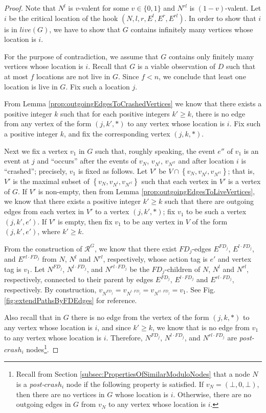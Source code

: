 \documentclass[11pt]{article}
\numberwithin{theorem}{section}
\newcommand{\set}[1]{\left\{#1\right\}}
\begin{document}
\begin{proof}
Note that $N^l$ is $v$-valent for some $v\in\{0,1\}$ and $N^{rl}$ is $(1-v)$-valent. 
Let $i$ be the critical location of the hook $(N,l,r,E^l,E^r,E^{rl})$. 
In order to show that $i$ is in $live(G)$, we have to show that $G$ contains infinitely many vertices whose location is $i$.

For the purpose of contradiction, we assume that $G$ contains only finitely many vertices whose location is $i$. Recall that $G$ is a viable observation of $D$ such that at most $f$ locations are not live in $G$. Since $f<n$, we conclude that least one location is live in $G$. Fix such a location $j$.



From Lemma \ref{prop:outgoingEdgesToCrashedVertices} we know that there exists a positive integer $k$ such that for each positive integers $k' \geq k$, there is no edge from any vertex of the form $(j,k',*)$ to any vertex whose location is $i$. Fix such a positive integer $k$, and fix the corresponding vertex $(j,k,*)$.

Next we fix a vertex $v_1$ in $G$ such that, roughly speaking, the event $e''$ of $v_1$ is an event at $j$ and ``occurs'' after the events of $v_N$, $v_{N^l}$, $v_{N^{rl}}$ and after location $i$ is ``crashed''; precisely, $v_1$ is fixed as follows. Let $V'$ be $V \cap \set{v_N, v_{N^l}, v_{N^{rl}}}$; that is, $V'$ is the maximal subset of $\set{v_N, v_{N^l}, v_{N^{rl}}}$ such that each vertex in $V'$ is a vertex  of $G$. If $V'$ is non-empty, then from Lemma \ref{prop:outgoingEdgesToLiveVertices}, we know that there exists a positive integer $k' \geq k$ such that there are outgoing edges from each vertex in $V'$ to a vertex $(j,k',*)$; fix $v_1$ to be such a vertex $(j,k',e')$. If $V'$ is empty, then fix $v_1$ to be any vertex in $V$ of the form $(j,k',e')$, where $k' \geq k$.

From the construction of $\mathcal{R}^G$, we know that there exist $FD_j$-edges $E^{FD_j}$, $E^{l\cdot FD_j}$, and $E^{rl \cdot FD_j}$ from $N$, $N^l$ and $N^{rl}$, respectively, whose action tag is $e'$ and vertex tag is $v_1$. Let $N^{FD_j}$, $N^{l\cdot FD_j}$, and $N^{rl\cdot FD_j}$ be the $FD_j$-children of $N$, $N^l$ and $N^{rl}$, respectively, connected to their parent by edges $E^{FD_j}$, $E^{l \cdot FD_j}$ and $E^{rl \cdot FD_j}$, respectively. By construction, $v_{N^{FD_j}} = v_{N^{l \cdot FD_j}} = v_{N^{rl \cdot FD_j}} = v_1$. See Fig. \ref{fig:extendPathsByFDEdges} for reference. 

Also recall that in $G$ there is no edge from the vertex of the form $(j,k,*)$ to any vertex whose location is $i$, and since $k' \geq k$, we know that is no edge from $v_1$ to any vertex whose location is $i$. Therefore, $N^{FD_j}$, $N^{l\cdot FD_j}$, and $N^{rl\cdot FD_j}$ are \emph{post-$crash_i$} nodes\footnote{Recall from Section \ref{subsec:PropertiesOfSimilarModuloNodes} that a node $N$ is a \emph{post-$crash_i$} node if the following property is satisfied. If $v_N = (\bot, 0 ,\bot)$, then there are no vertices in $G$ whose location is $i$. Otherwise, there are no outgoing edges in $G$ from $v_N$ to any vertex whose location is $i$.}.



\end{proof}
\end{document}
